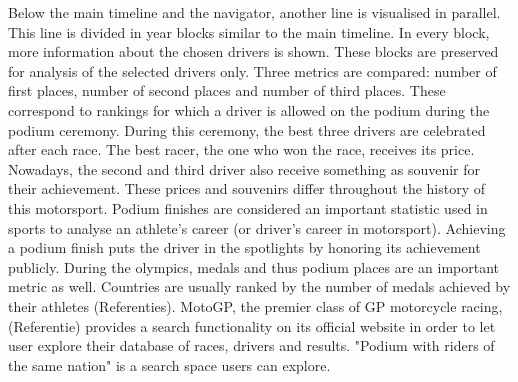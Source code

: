 \documentclass{sigchi}
\begin{document}
Below the main timeline and the navigator, another line is visualised in parallel. This line is divided in year blocks similar to the main timeline. In every block, more information about the chosen drivers is shown. These blocks are preserved for analysis of the selected drivers only. Three metrics are compared: number of first places, number of second places and number of third places. These correspond to rankings for which a driver is allowed on the podium during the podium ceremony. During this ceremony, the best three drivers are celebrated after each race. The best racer, the one who won the race, receives its price. Nowadays, the second and third driver also receive something as souvenir for their achievement. These prices and souvenirs differ throughout the history of this motorsport.  Podium finishes are considered an important statistic used in sports to analyse an athlete's career (or driver's career in motorsport). Achieving a podium finish puts the driver in the spotlights by honoring its achievement publicly. During the olympics, medals and thus podium places are an important metric as well. Countries are usually ranked by the number of medals achieved by their athletes (Referenties). MotoGP, the premier class of GP motorcycle racing, (Referentie) provides a search functionality on its official website in order to let user explore their database of races, drivers and results. "Podium with riders of the same nation" is a search space users can explore.
\end{document}
